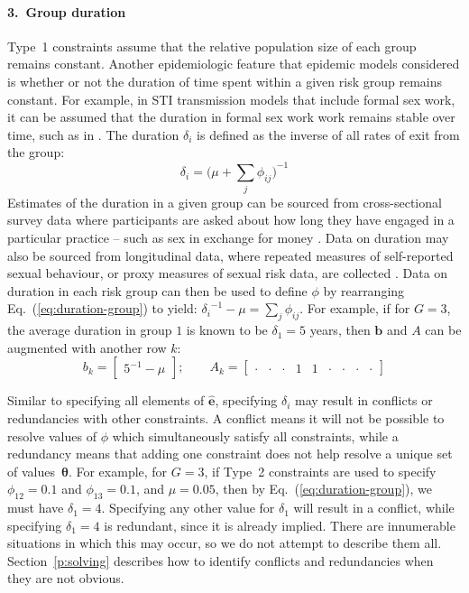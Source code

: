 \paragraph{3.~Group duration}
\label{con:group-dur}
Type~1 constraints assume that the relative population size of each group remains constant.
Another epidemiologic feature that epidemic models considered
is whether or not the duration of time spent within a given risk group remains constant.
For example, in STI transmission models that include formal sex work,
it can be assumed that the duration in formal sex work work remains stable over time,
such as in \citep{Mishra2014,Boily2015}.
The duration $\delta_i$ is defined as the inverse of all rates of exit from the group:
\begin{equation}\label{eq:duration-group}
\delta_i = {\bigg(\mu + \sum_{j}{\phi_{ij}}\bigg)}^{-1}
\end{equation}
Estimates of the duration in a given group can be sourced from
cross-sectional survey data where participants are asked about
how long they have engaged in a particular practice
-- such as sex in exchange for money \citep{Watts2010}.
Data on duration may also be sourced from longitudinal data,
where repeated measures of self-reported sexual behaviour,
or proxy measures of sexual risk data,
are collected \citep{DHS,PHIAproject}.
Data on duration in each risk group can then be used to define $\phi$ by
rearranging Eq.~(\ref{eq:duration-group}) to yield:
${\delta_{i}}^{-1} - \mu = \sum_{j}{\phi_{ij}}$.
For example, if for $G = 3$,
the average duration in group $1$ is known to be $\delta_1 = 5$ years,
then $\bm{b}$ and $A$ can be augmented with another row $k$:
\begin{equation}\label{eq:eg-dur}
b_k = \left[\begin{array}{c}
{5}^{-1} - \mu
\end{array}\right];\qquad
A_k = \left[\begin{array}{ccccccccc}
  \cdot & \cdot & \cdot & 1 & 1 & \cdot & \cdot & \cdot & \cdot
\end{array}\right]
\end{equation}
\par
Similar to specifying all elements of $\bm{\hat{e}}$,
specifying $\delta_i$ may result in conflicts or redundancies with other constraints.
A conflict means it will not be possible to resolve values of $\phi$
which simultaneously satisfy all constraints, while
a redundancy means that adding one constraint does not help resolve
a unique set of values~$\bm{\theta}$.
For example, for $G = 3$,
if Type~2 constraints are used to specify $\phi_{12} = 0.1$ and $\phi_{13} = 0.1$,
and $\mu = 0.05$, then by Eq.~(\ref{eq:duration-group}), we must have
$\delta_1 = 4$.
Specifying any other value for $\delta_1$ will result in a conflict,
while specifying $\delta_1 = 4$ is redundant,
since it is already implied.
There are innumerable situations in which this may occur,
so we do not attempt to describe them all.
Section~\ref{p:solving} describes how to identify
conflicts and redundancies when they are not obvious.
